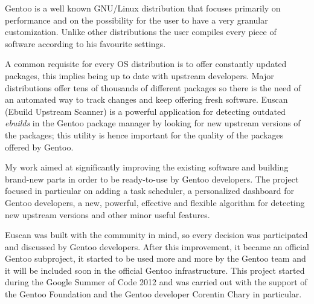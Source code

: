 
Gentoo is a well known GNU/Linux distribution that focuses primarily on performance and on the possibility for the user to have a very granular customization. Unlike other distributions the user compiles every piece of software according to his favourite settings.

A common requisite for every OS distribution is to offer constantly updated packages, this implies being up to date with upstream developers. Major distributions offer tens of thousands of different packages so there is the need of an automated way to track changes and keep offering fresh software.
Euscan (Ebuild Upstream Scanner) is a powerful application for detecting outdated \emph{ebuilds} in the Gentoo package manager by looking for new upstream versions of the packages; this utility is hence important for the quality of the packages offered by Gentoo.

My work aimed at significantly improving the existing software and building brand-new parts in order to be ready-to-use by Gentoo developers. The project focused in particular on adding a task scheduler, a personalized dashboard for Gentoo developers, a new, powerful, effective and flexible algorithm for detecting new upstream versions and other minor useful features.

Euscan was built with the community in mind, so every decision was participated and discussed by Gentoo developers. After this improvement, it became an official Gentoo subproject, it started to be used more and more by the Gentoo team and it will be included soon in the official Gentoo infrastructure.
This project started during the Google Summer of Code 2012 and was carried out with the support of the Gentoo Foundation and the Gentoo developer Corentin Chary in particular.
